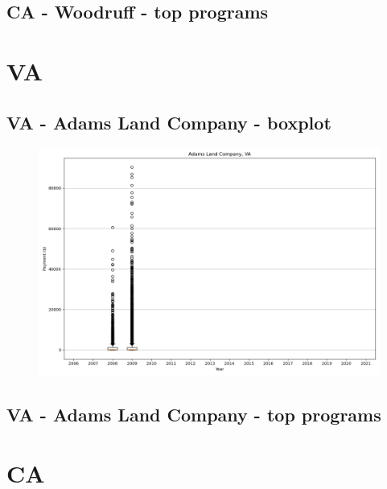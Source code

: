 \subsection*{CA - Woodruff - top programs}

\newpage
\section*{VA}
\subsection*{VA - Adams Land Company - boxplot}
\begin{figure}[h]
\centering
\includegraphics[width=7in]{../output/boxplots/counties/Adams Land Company-VA_boxplot.png}
\end{figure}


\subsection*{VA - Adams Land Company - top programs}

\newpage
\section*{CA}
